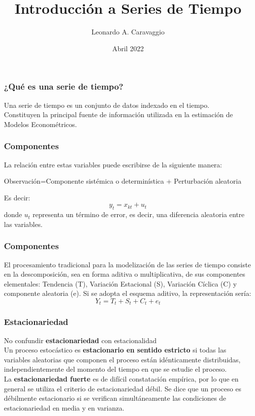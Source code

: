 \documentclass{beamer}
\title{Introducción a Series de Tiempo}
\author{Leonardo A. Caravaggio}
\date{Abril 2022}
\begin{document}
\maketitle

\begin{frame}
\frametitle{¿Qué es una serie de tiempo?}

\justify
Una serie de tiempo es un conjunto de datos indexado en el tiempo.\\
\vspace{5mm} %
Constituyen la principal fuente de información utilizada en la estimación de Modelos Econométricos. 
\end{frame}


\begin{frame}
\frametitle{Componentes}

\justify
La relación entre estas variables puede escribirse de la siguiente manera: \\
\vspace{5mm} %
\begin{center}
Observación=Componente sistémica o determinística + Perturbación aleatoria \\
\end{center}
\vspace{5mm} %
Es decir: 
\[
y_t=x_{kt}+u_t
\]
donde $u_t$ representa un término de error, es decir, una diferencia aleatoria entre las variables. 

\end{frame}


\begin{frame}
\frametitle{Componentes}

\justify
El procesamiento tradicional para la modelización de las series de tiempo consiste en la descomposición, sea en forma aditiva o multiplicativa, de sus componentes elementales: Tendencia (T), Variación Estacional (S), Variación Cíclica (C) y componente aleatoria (e). Si se adopta el esquema aditivo, la representación sería: 
\[
Y_t=T_t+S_t+C_t+e_t
\]
\end{frame}

\begin{frame}
\frametitle{Estacionariedad}
\justify
No confundir \textbf{estacionariedad} con estacionalidad\\
\vspace{5mm} %
Un proceso estocástico es \textbf{estacionario en sentido estricto} si todas las variables aleatorias que componen el proceso están idénticamente distribuidas, independientemente del momento del tiempo en que se estudie el proceso.\\
\vspace{5mm} %
La \textbf{estacionariedad fuerte} es de difícil constatación empírica, por lo que en general se utiliza el criterio de estacionariedad débil. Se dice que un proceso es débilmente estacionario si se verifican simultáneamente las condiciones de estacionariedad en media y en varianza.

\end{frame}
\end{document}
